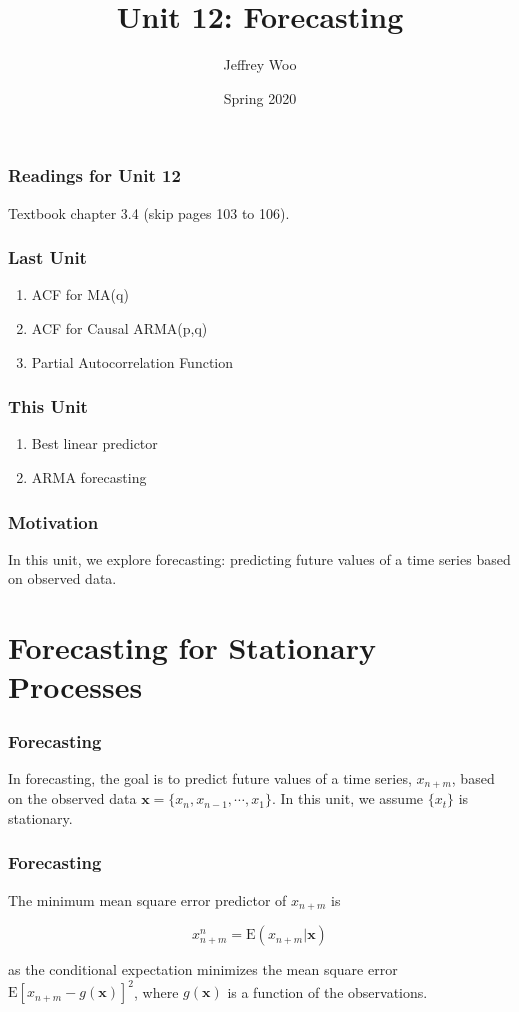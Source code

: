 \documentclass[%
xcolor=pdftex]{beamer}
\title{Unit 12: Forecasting}
\author[STAT 5170: Applied Time Series, Unit 12]{Jeffrey Woo}
\institute{Department of Statistics, University of Virginia}
\date{Spring 2020} %
\begin{document}
\frame{\titlepage}


\begin{frame}
\frametitle{Readings for Unit 12}


Textbook chapter 3.4 (skip pages 103 to 106).

\end{frame}



\begin{frame}
\frametitle{Last Unit}
\begin{enumerate}
\item ACF for MA(q)
\item ACF for Causal ARMA(p,q)
\item Partial Autocorrelation Function
\end{enumerate}
\end{frame}

\begin{frame}
\frametitle{This Unit}
\begin{enumerate}
\item Best linear predictor
\item ARMA forecasting
\end{enumerate}
\end{frame}


\begin{frame}
\frametitle{Motivation}

In this unit, we explore forecasting: predicting future values of a time series based on observed data.

\end{frame}

\section{Forecasting for Stationary Processes}
\frame{\tableofcontents[currentsection]}

\begin{frame}
\frametitle{Forecasting}

In forecasting, the goal is to predict future values of a time series, $x_{n+m}$, based on the observed data $\mathbf{x} = \{x_n, x_{n-1}, \cdots, x_1 \}$. In this unit, we assume $\{x_t\}$ is stationary.

\end{frame}

\begin{frame}
\frametitle{Forecasting}

The minimum mean square error predictor of $x_{n+m}$ is

\begin{equation}
x_{n+m}^n = \mbox{E}(x_{n+m} | \mathbf{x})
\end{equation}

as the conditional expectation minimizes the mean square error $\mbox{E}\left[x_{n+m} - g(\mathbf{x}) \right]^2$, where $g(\mathbf{x})$ is a function of the observations.

\end{frame}
\end{document}
